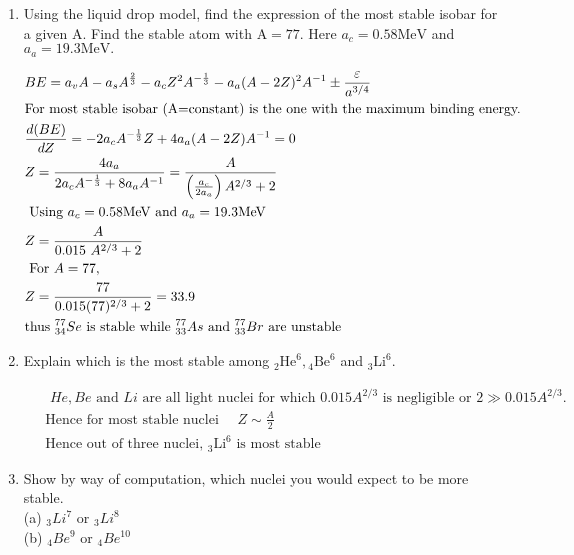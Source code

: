 \begin{enumerate}
	\item  Using the liquid drop model, find the expression of the most stable isobar for a given A. Find the stable atom with $\mathrm{A}=77$. Here $a_c=0.58 \mathrm{MeV}$ and $a_a=19.3 \mathrm{MeV} . $
	\begin{answer}
		\begin{align*}
		&B E=a_v A-a_s A^{\frac{2}{3}}-a_c Z^2 A^{-\frac{1}{3}}-a_a(A-2 Z)^2 A^{-1} \pm \frac{{\varepsilon}}{a^{3/4}}\\
		&\text{For most stable isobar (A=constant) is the one with the maximum binding energy. }\\
		&\frac{d(B E)}{d Z}=-2 a_c A^{-\frac{1}{3}} Z+4 a_a(A-2 Z) A^{-1}=0\\
		&Z=\frac{4 a_a}{2 a_c A^{-\frac{1}{3}}+8 a_{a} A^{-1}}=\frac{A}{\left(\frac{a_c}{2a_a}\right) A^{2 / 3}+2}\\
		&\text { Using } a_c=0.58 \mathrm{MeV} \text { and } a_a=19.3 \mathrm{MeV}\\
		&Z=\frac{A}{0.015 \ A^{2/3}+2}\\
		&\text { For } A=77 \text {, }\\
		&Z=\frac{77}{0.015(77)^{2 / 3}+2}=33.9\\
		&\text{thus ${}^{77}_{34}Se$ is stable while ${}^{77}_{33}As$ and $ {}^{77}_{33}Br$ are unstable}
		\end{align*}
	\end{answer}
\item  Explain which is the most stable among ${ }_2 \mathrm{He}^6,{ }_4 \mathrm{Be}^6$ and ${ }_3 \mathrm{Li}^6$.
	\begin{answer}
	\begin{align*}
	&\text{ $H e, B e$ and $L i$ are all light nuclei for which $0.015 A^{2 / 3}$ is negligible or $2 \gg 0.015 A^{2 / 3}$.}\\
	&\text{	Hence for most stable nuclei $\quad Z \sim \frac{A}{2}$}\\
	&\text{	Hence out of three nuclei, ${ }_3 \mathrm{Li}^6$ is most stable}
	\end{align*}
\end{answer}
\item  Show by way of computation, which nuclei you would expect to be more stable.\\
(a) ${ }_3 L i^7$ or ${ }_3 L i^8$\\
(b) ${ }_4 B e^9$ or ${ }_4 B e^{10}$ 
\begin{answer}
	\begin{align*}

\end{align*}
\end{answer}
\end{enumerate}
